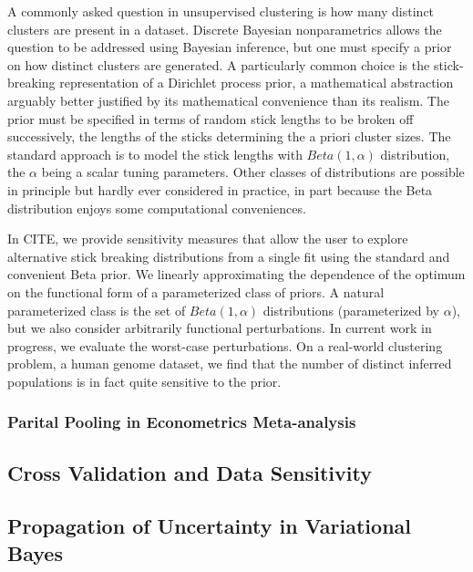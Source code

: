 A commonly asked question in unsupervised clustering is how many distinct
clusters are present in a dataset.  Discrete Bayesian nonparametrics allows the
question to be addressed using Bayesian inference, but one must specify a prior
on how distinct clusters are generated.  A particularly common choice is
the stick-breaking representation of a Dirichlet process prior, a mathematical
abstraction arguably better justified by its mathematical convenience than
its realism.  The prior must be specified in terms of random stick lengths
to be broken off successively, the lengths of the sticks determining
the a priori cluster sizes.  The standard approach is to model the stick
lengths with $Beta(1, \alpha)$ distribution, the $\alpha$ being a scalar
tuning parameters.  Other classes of distributions are possible in principle
but hardly ever considered in practice, in part because the Beta distribution
enjoys some computational conveniences.

In CITE, we provide sensitivity measures that allow the user to explore
alternative stick breaking distributions from a single fit using the standard
and convenient Beta prior.  We linearly approximating the dependence of the
optimum on the functional form of a parameterized class of priors.  A natural
parameterized class is the set of $Beta(1, \alpha)$ distributions (parameterized
by $\alpha$), but we also consider arbitrarily functional perturbations.
In current work in progress, we evaluate the worst-case perturbations.
On a real-world clustering problem, a human genome dataset, we find that
the number of distinct inferred populations is in fact quite sensitive
to the prior.


\subsubsection*{Parital Pooling in Econometrics Meta-analysis}


\subsection*{Cross Validation and Data Sensitivity}


\subsection*{Propagation of Uncertainty in Variational Bayes}








